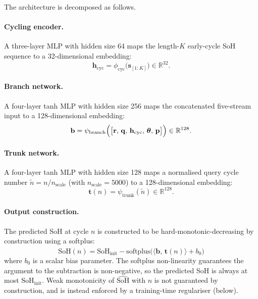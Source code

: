 \documentclass[preprint,12pt,3p,authoryear]{elsarticle}
\begin{document}
The architecture is decomposed as follows.

\paragraph{Cycling encoder.} A three-layer MLP with hidden size \num{64}
maps the length-\(K\) early-cycle SoH sequence to a \num{32}-dimensional
embedding:
\begin{equation}
    \mathbf{h}_\text{cyc} = \phi_\text{cyc}\bigl(\mathbf{s}_{[1:K]}\bigr)
    \in \mathbb{R}^{32}.
\end{equation}

\paragraph{Branch network.} A four-layer tanh MLP with hidden size
\num{256} maps the concatenated five-stream input to a
\num{128}-dimensional embedding:
\begin{equation}
    \mathbf{b} = \psi_\text{branch}\Bigl(\bigl[\mathbf{r},\,
    \mathbf{q},\, \mathbf{h}_\text{cyc},\, \boldsymbol{\theta},\,
    \mathbf{p}\bigr]\Bigr) \in \mathbb{R}^{128}.
\end{equation}

\paragraph{Trunk network.} A four-layer tanh MLP with hidden size
\num{128} maps a normalised query cycle number
\(\tilde{n} = n / n_\text{scale}\) (with \(n_\text{scale} = \num{5000}\))
to a \num{128}-dimensional embedding:
\begin{equation}
    \mathbf{t}(n) = \psi_\text{trunk}(\tilde{n}) \in \mathbb{R}^{128}.
\end{equation}

\paragraph{Output construction.} The predicted SoH at cycle \(n\) is
constructed to be hard-monotonic-decreasing by construction using a
softplus:
\begin{equation}
    \widehat{\text{SoH}}(n) = \text{SoH}_\text{init} -
    \text{softplus}\bigl(\langle \mathbf{b},\, \mathbf{t}(n)\rangle + b_0\bigr)
    \label{eq:output}
\end{equation}
where \(b_0\) is a scalar bias parameter. The softplus non-linearity
guarantees the argument to the subtraction is non-negative, so the
predicted SoH is always at most \(\text{SoH}_\text{init}\). Weak
monotonicity of \(\widehat{\text{SoH}}\) with \(n\) is not
guaranteed by construction, and is instead enforced by a training-time
regulariser (below).
\end{document}
